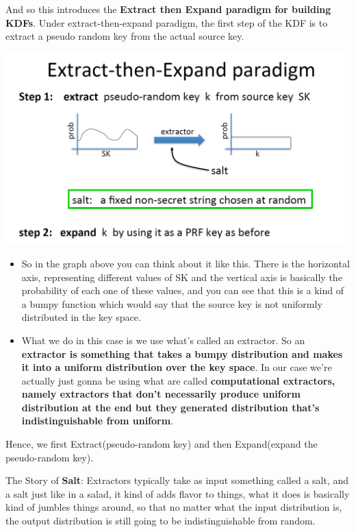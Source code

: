 \documentclass[11pt]{article}
\makeatletter
\def\maxwidth{\ifdim\Gin@nat@width>\linewidth\linewidth
    \else\Gin@nat@width\fi}
\let\Oldincludegraphics\includegraphics
\renewcommand{\includegraphics}[1]{\Oldincludegraphics[width=.8\maxwidth]{#1}}
\providecommand{\tightlist}{%
      \setlength{\itemsep}{0pt}\setlength{\parskip}{0pt}}
\makeatother
\begin{document}
And so this introduces the \textbf{Extract then Expand paradigm for
building KDFs}. Under extract-then-expand paradigm, the first step of
the KDF is to extract a pseudo random key from the actual source key.

\includegraphics{./Images/ExtractThenExpand.png}

\begin{itemize}
\tightlist
\item
  So in the graph above you can think about it like this. There is the
  horizontal axis, representing different values of SK and the vertical
  axis is basically the probability of each one of these values, and you
  can see that this is a kind of a bumpy function which would say that
  the source key is not uniformly distributed in the key space.
\item
  What we do in this case is we use what's called an extractor. So an
  \textbf{extractor is something that takes a bumpy distribution and
  makes it into a uniform distribution over the key space}. In our case
  we're actually just gonna be using what are called
  \textbf{computational extractors, namely extractors that don't
  necessarily produce uniform distribution at the end but they generated
  distribution that's indistinguishable from uniform}.
\end{itemize}

Hence, we first Extract(pseudo-random key) and then Expand(expand the
pseudo-random key).

The Story of \textbf{Salt}: Extractors typically take as input something
called a salt, and a salt just like in a salad, it kind of adds flavor
to things, what it does is basically kind of jumbles things around, so
that no matter what the input distribution is, the output distribution
is still going to be indistinguishable from random.
\end{document}
